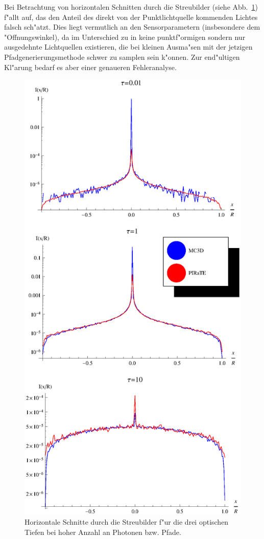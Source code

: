 	Bei Betrachtung von horizontalen Schnitten durch die Streubilder (siehe Abb.~\ref{fig:sphere_image_cuts}) f"allt auf, das \pirate den Anteil des direkt von der Punktlichtquelle kommenden Lichtes falsch sch"atzt. Dies liegt vermutlich an den Sensorparametern (insbesondere dem "Offnungswinkel), da im Unterschied zu \mctd in \pirate keine punktf"ormigen sondern nur ausgedehnte Lichtquellen existieren, die bei kleinen Ausma"sen mit der jetzigen Pfadgenerierungsmethode schwer zu samplen sein k"onnen. Zur end"ultigen Kl"arung bedarf es aber einer genaueren Fehleranalyse.
	
		\begin{figure}
			\centering
			\includegraphics[height=1.0\textheight]{sphere_image_cuts.eps}
			\caption{Horizontale Schnitte durch die Streubilder f"ur die drei optischen Tiefen bei hoher Anzahl an Photonen bzw. Pfade.}
			\label{fig:sphere_image_cuts}
		\end{figure}
	
